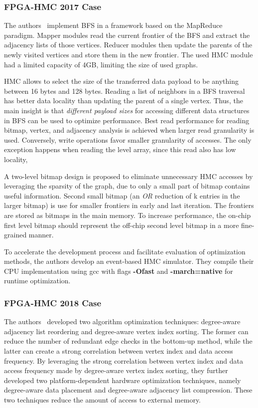 \documentclass[UTF8,12pt,a4paper]{article}
\begin{document}
\subsubsection{FPGA-HMC 2017 Case}
The authors~\cite{DBLP:conf/fpga/ZhangKL17}
implement BFS in a framework based on the MapReduce paradigm.
Mapper modules read the current frontier of the BFS and extract the adjacency lists of those vertices.
Reducer modules then update the parents of the newly visited vertices and store them in the new frontier.
The used HMC module had a limited capacity of 4GB, limiting the size of used graphs.

HMC allows to select the size of the transferred data payload
to be anything between 16 bytes and 128 bytes.
Reading a list of neighbors in a BFS traversal has better data locality
than updating the parent of a single vertex.
Thus, the main insight is that \textit{different payload sizes}
for accessing different data structures in BFS can be used to optimize performance.
Best read performance for reading bitmap, vertex, and adjacency analysis
is achieved when larger read granularity is used.
Conversely, write operations favor smaller granularity of accesses.
The only exception happens when reading the level array,
since this read also has low locality,

A two-level bitmap design is proposed to eliminate unnecessary HMC accesses
by leveraging the sparsity of the graph,
due to only a small part of bitmap contains useful information.
Second small bitmap (an \textit{OR} reduction of k entries in the larger bitmap)
is use for smaller frontiers in early and last iteration.
The frontiers are stored as bitmaps in the main memory.
To increase performance, the on-chip first level bitmap should
represent the off-chip second level bitmap in a more fine-grained manner.

To accelerate the development process and facilitate evaluation of optimization methods,
the authors develop an event-based HMC simulator.
They compile their CPU implementation using gcc with
flags \textbf{-Ofast} and \textbf{-march=native} for runtime optimization.
\subsubsection{FPGA-HMC 2018 Case}
The authors~\cite{DBLP:conf/fpga/ZhangL18}
developed two algorithm optimization techniques:
degree-aware adjacency list reordering and degree-aware vertex index sorting.
The former can reduce the number of redundant edge checks in the bottom-up method,
while the latter can create a strong correlation between vertex index and data access frequency.
By leveraging the strong correlation between vertex index and data access frequency
made by degree-aware vertex index sorting,
they further developed two platform-dependent hardware optimization techniques,
namely degree-aware data placement and degree-aware adjacency list compression.
These two techniques reduce the amount of access to external memory.
\end{document}

